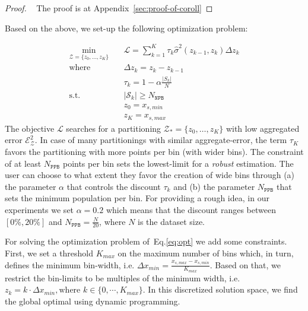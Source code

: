 \documentclass[twoside]{article}
\begin{document}
\begin{proof}
~\label{sec:coroll-1}
  The proof is at Appendix~\ref{sec:proof-of-coroll}
  \end{proof}

Based on the above, we set-up the following optimization problem:

\begin{equation}
  \label{eq:opt}
\begin{aligned}
  \min_{ \mathcal{Z} = \{z_0, \ldots, z_K\}} \quad & \mathcal{L} = \sum_{k=1}^K \tau_k \hat{\sigma}^2(z_{k-1}, z_k) \Delta z_k \\
  \textrm{where} \quad & \Delta z_k = z_k - z_{k-1} \\
  & \tau_k = 1 - \alpha \frac{|S_k|}{N} \\
  \textrm{s.t.} \quad & |\mathcal{S}_k| \geq N_{\mathtt{NPB}}\\
                                     & z_0 = x_{s,min}\\
                                     & z_K = x_{s, max}
\end{aligned}
\end{equation}
%
The objective \(\mathcal{L}\) searches for a partitioning
\(\mathcal{Z}_* = \{ z_0, \ldots, z_K \} \) with low aggregated error
\(\mathcal{E}_{\mathcal{Z}}^2\). In case of many partitionings with
similar aggregate-error, the term \(\tau_K\) favors the partitioning
with more points per bin (with wider bins). The constraint of at least
\(N_{\mathtt{PPB}}\) points per bin sets the lowest-limit for a
\textit{robust} estimation. The user can choose to what extent they
favor the creation of wide bins through (a) the parameter \(\alpha\)
that controls the discount \(\tau_k\) and (b) the parameter
\(N_{\mathtt{PPB}}\) that sets the minimum population per bin. For
providing a rough idea, in our experiments we set \(\alpha = 0.2\)
which means that the discount ranges between \([0\%, 20\%]\) and
\(N_{\mathtt{PPB}} = \frac{N}{20}\), where \(N\) is the dataset size.

For solving the optimization problem of~Eq.\ref{eq:opt} we add some
constraints. First, we set a threshold \(K_{max}\) on the maximum
number of bins which, in turn, defines the minimum bin-width,
i.e. \(\Delta x_{min} = \frac{x_{s, max} - x_{s,min}}{K_{max}}\).
Based on that, we restrict the bin-limits to be multiples of the
minimum width, i.e.
\(z_k = k\cdot \Delta x_{min}, \text{where } k \in \{0 , \cdots,
K_{max}\} \). In this discretized solution space, we find the global
optimal using dynamic programming.
\end{document}
